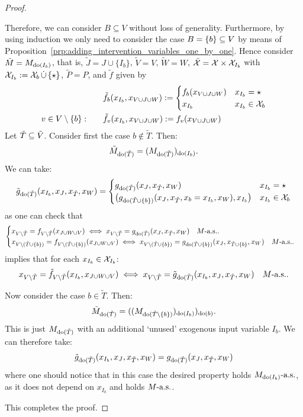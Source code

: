 \begin{proof}
\begin{enumerate}
      Therefore, we can consider $B \subseteq V$ without loss of generality.
      Furthermore, by using induction we only need to consider the case $B = \{b\} \subseteq V$ by means of Proposition~\ref{prp:adding_intervention_variables_one_by_one}.
      Hence consider $\tilde{M} = M_{\operatorname{do}(I_b)}$, that is, $\tilde J = J \cup \{I_b\}$, $\tilde V = V$, $\tilde W = W$, $\tilde {\mathcal{X}} = \mathcal{X} \times \mathcal{X}_{I_b}$ with $\mathcal{X}_{I_b} := \mathcal{X}_b \,\dot\cup\, \{\star\}$, $\tilde P = P$, and $\tilde f$ given by
  \begin{align*}
    & \tilde{f}_b(x_{I_b},x_{V \cup J \cup W}) := \begin{cases}
      f_b(x_{V \cup J \cup W}) & x_{I_b} = \star \\
      x_{I_b} & x_{I_b} \in \mathcal{X}_b
    \end{cases}\\
    v \in V \setminus \{b\}: \qquad & \tilde{f}_v(x_{I_b},x_{V \cup J \cup W}) := f_v(x_{V \cup J \cup W})
  \end{align*}
    Let $\tilde{T} \subseteq \tilde{V}$.
    Consider first the case $b \notin \tilde{T}$. Then:
      $$\tilde{M}_{\operatorname{do}(\tilde{T})} = (M_{\operatorname{do}(\tilde{T})})_{\operatorname{do}(I_b)}.$$
    We can take:
      $$\tilde{g}_{\operatorname{do}(\tilde{T})}(x_{I_b},x_J,x_{\tilde{T}},x_W) = \begin{cases}
        g_{\operatorname{do}(\tilde{T})}(x_J,x_{\tilde{T}},x_W) & x_{I_b} = \star \\
        \big(g_{\operatorname{do}(\tilde{T} \cup \{b\})}(x_J,x_{\tilde{T}},x_b=x_{I_b},x_W),x_{I_b}\big) & x_{I_b} \in \mathcal{X}_b 
      \end{cases}$$
    as one can check that 
      $$
      \begin{cases}
      x_{V\setminus \tilde{T}} = f_{V\setminus \tilde{T}}(x_{J \cup W \cup V}) \iff x_{V\setminus \tilde{T}} = g_{\operatorname{do}(\tilde{T})}(x_J, x_{\tilde{T}}, x_W)\quad M\text{-a.s.}. \\
      x_{V\setminus (\tilde{T} \cup \{b\})} = f_{V\setminus (\tilde{T}\cup\{b\})}(x_{J \cup W \cup V}) \iff x_{V\setminus (\tilde{T}\cup\{b\})} = g_{\operatorname{do}(\tilde{T}\cup\{b\})}(x_J, x_{\tilde{T}\cup\{b\}}, x_W)\quad M\text{-a.s.}.
      \end{cases}$$
    implies that for each $x_{I_b} \in \mathcal{X}_{I_b}$:
      $$x_{V\setminus \tilde{T}} = \tilde{f}_{V\setminus \tilde{T}}(x_{I_b},x_{J\cup W\cup V}) \iff x_{V\setminus \tilde{T}} = \tilde{g}_{\operatorname{do}(\tilde{T})}(x_{I_b}, x_J, x_{\tilde{T}}, x_W)\quad M\text{-a.s.}.$$

    Now consider the case $b \in \tilde{T}$. Then:
      $$\tilde{M}_{\operatorname{do}(\tilde{T})} = ((M_{\operatorname{do}(\tilde{T}\setminus \{b\})})_{\operatorname{do}(I_b)})_{\operatorname{do}(b)}.$$
    This is just $M_{\operatorname{do}(\tilde{T})}$ with an additional `unused' exogenous input variable $I_b$.
    We can therefore take:
      $$\tilde{g}_{\operatorname{do}(\tilde{T})}(x_{I_b},x_J,x_{\tilde{T}},x_W) = g_{\operatorname{do}(\tilde{T})}(x_J,x_{\tilde{T}},x_W)$$
    where one should notice that in this case the desired property holds $M_{\operatorname{do}(I_b)}\text{-a.s.}$, as it does not depend on $x_{I_b}$ and holds $M\text{-a.s.}$.
  \end{enumerate}
  This completes the proof.
\end{proof}
